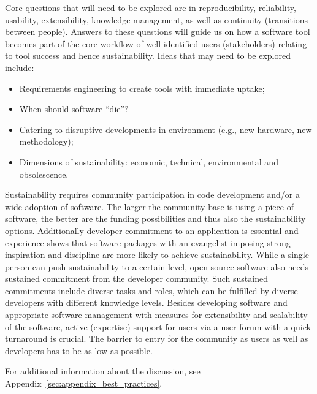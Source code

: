 Core questions that will need to be explored are in reproducibility, 
reliability,  usability, extensibility, knowledge management, as well as continuity
(transitions between people). Answers to these questions will guide us on how a software
tool becomes part of the core workflow of well identified users (stakeholders)
relating to tool success and hence sustainability.
Ideas  that may need to be explored include:
\begin{itemize}
\item Requirements engineering to create tools with immediate uptake;
\item When should software ``die''?
\item Catering to disruptive developments in environment (e.g., new hardware,
new methodology);
\item Dimensions of sustainability: economic, technical, environmental and
obsolescence. 
\end{itemize}

Sustainability requires community participation in code development and/or a
wide adoption of software. The larger the community base is using a piece of
software, the better are the funding possibilities and thus also the
sustainability options. Additionally developer commitment to an application is
essential and experience shows that software packages with an evangelist
imposing strong inspiration and discipline are more likely to achieve
sustainability. While a single person can push sustainability to a certain
level, open source software also needs sustained commitment from the developer
community. Such sustained commitments include diverse tasks and roles, which can
be fulfilled by diverse developers with different knowledge levels. Besides
developing software and appropriate software management with measures for
extensibility and scalability of the software, active (expertise) support for
users via a user forum with a quick turnaround is crucial. The barrier to entry
for the community as users as well as developers has to be as low as possible.

For additional information about the discussion, see
Appendix~\ref{sec:appendix_best_practices}.

